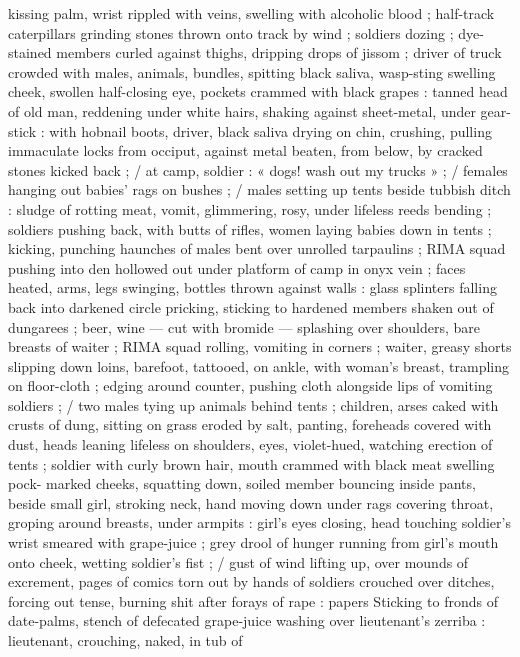 kissing palm, wrist rippled with veins, swelling with alcoholic blood ;
half-track caterpillars grinding stones thrown onto track by wind ;
soldiers dozing ; dye-stained members curled against thighs,
dripping drops of jissom ; driver of truck crowded with males,
animals, bundles, spitting black saliva, wasp-sting swelling cheek,
swollen half-closing eye, pockets crammed with black grapes :
tanned head of old man, reddening under white hairs, shaking
against sheet-metal, under gear-stick : with hobnail boots, driver,
black saliva drying on chin, crushing, pulling immaculate locks from
occiput, against metal beaten, from below, by cracked stones kicked
back ; / at camp, soldier : « dogs! wash out my trucks » ; / females
hanging out babies’ rags on bushes ; / males setting up tents beside
tubbish ditch : sludge of rotting meat, vomit, glimmering, rosy, under
lifeless reeds bending ; soldiers pushing back, with butts of rifles,
women laying babies down in tents ; kicking, punching haunches of
males bent over unrolled tarpaulins ; RIMA squad pushing into den
hollowed out under platform of camp in onyx vein ; faces heated,
arms, legs swinging, bottles thrown against walls : glass splinters
falling back into darkened circle pricking, sticking to hardened
members shaken out of dungarees ; beer, wine --- cut with bromide
--- splashing over shoulders, bare breasts of waiter ; RIMA squad %
rolling, vomiting in corners ; waiter, greasy shorts slipping down
loins, barefoot, tattooed, on ankle, with woman's breast, trampling
on floor-cloth ; edging around counter, pushing cloth alongside lips
of vomiting soldiers ; / two males tying up animals behind tents ;
children, arses caked with crusts of dung, sitting on grass eroded by
salt, panting, foreheads covered with dust, heads leaning lifeless on
shoulders, eyes, violet-hued, watching erection of tents ; soldier with
curly brown hair, mouth crammed with black meat swelling pock-
marked cheeks, squatting down, soiled member bouncing inside
pants, beside small girl, stroking neck, hand moving down under rags
covering throat, groping around breasts, under armpits : girl’s eyes
closing, head touching soldier's wrist smeared with grape-juice ; grey
drool of hunger running from girl's mouth onto cheek, wetting
soldier's fist ; / gust of wind lifting up, over mounds of excrement,
pages of comics torn out by hands of soldiers crouched over ditches,
forcing out tense, burning shit after forays of rape : papers Sticking
to fronds of date-palms, stench of defecated grape-juice washing
over lieutenant's zerriba : lieutenant, crouching, naked, in tub of
